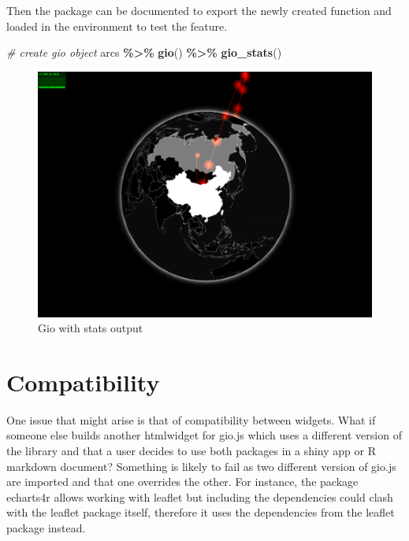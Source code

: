 \documentclass[
]{krantz}
\makeatletter
\newenvironment{Shaded}{\begin{snugshade}}{\end{snugshade}}
\newcommand{\CommentTok}[1]{\textcolor[rgb]{0.37,0.37,0.37}{\textit{#1}}}
\newcommand{\KeywordTok}[1]{\textcolor[rgb]{0.27,0.27,0.27}{\textbf{#1}}}
\newcommand{\NormalTok}[1]{#1}
\newcommand{\OperatorTok}[1]{\textcolor[rgb]{0.43,0.43,0.43}{\textbf{#1}}}
\newcommand{\StringTok}[1]{\textcolor[rgb]{0.5,0.5,0.5}{#1}}
\newenvironment{kframe}{%
\medskip{}
\setlength{\fboxsep}{.8em}
 \def\at@end@of@kframe{}%
 \ifinner\ifhmode%
  \def\at@end@of@kframe{\end{minipage}}%
  \begin{minipage}{\columnwidth}%
 \fi\fi%
 \def\FrameCommand##1{\hskip\@totalleftmargin \hskip-\fboxsep
 \colorbox{shadecolor}{##1}\hskip-\fboxsep
     \hskip-\linewidth \hskip-\@totalleftmargin \hskip\columnwidth}%
 \MakeFramed {\advance\hsize-\width
   \@totalleftmargin\z@ \linewidth\hsize
   \@setminipage}}%
 {\par\unskip\endMakeFramed%
 \at@end@of@kframe}
\renewenvironment{Shaded}{\begin{kframe}}{\end{kframe}}
\makeatother
\begin{document}
Then the package can be documented to export the newly created function and loaded in the environment to test the feature.

\begin{Shaded}
\begin{Highlighting}[]
\CommentTok{\# create gio object}
\NormalTok{arcs }\OperatorTok{\%\textgreater{}\%}\StringTok{ }
\StringTok{  }\KeywordTok{gio}\NormalTok{() }\OperatorTok{\%\textgreater{}\%}\StringTok{ }
\StringTok{  }\KeywordTok{gio\_stats}\NormalTok{()}
\end{Highlighting}
\end{Shaded}

\begin{figure}
\centering
\includegraphics{images/stats.png}
\caption{Gio with stats output}
\end{figure}

\hypertarget{compatibility}{%
\section*{Compatibility}\label{compatibility}}


One issue that might arise is that of compatibility between widgets. What if someone else builds another htmlwidget for gio.js which uses a different version of the library and that a user decides to use both packages in a shiny app or R markdown document? Something is likely to fail as two different version of gio.js are imported and that one overrides the other. For instance, the package echarts4r \citep{R-echarts4r} allows working with leaflet but including the dependencies could clash with the leaflet package itself, therefore it uses the dependencies from the leaflet package instead.
\end{document}
